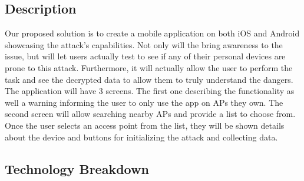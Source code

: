 \documentclass{article}
\begin{document}
\subsection{Description}\label{description}

Our proposed solution is to create a mobile application on both iOS and
Android showcasing the attack's capabilities. Not only will the bring
awareness to the issue, but will let users actually test to see if any
of their personal devices are prone to this attack. Furthermore, it will
actually allow the user to perform the task and see the decrypted data
to allow them to truly understand the dangers. The application will have
3 screens. The first one describing the functionality as well a warning
informing the user to only use the app on APs they own. The second
screen will allow searching nearby APs and provide a list to choose
from. Once the user selects an access point from the list, they will be
shown details about the device and buttons for initializing the attack
and collecting data.

\subsection{Technology Breakdown}\label{technology-breakdown}



\end{document}
